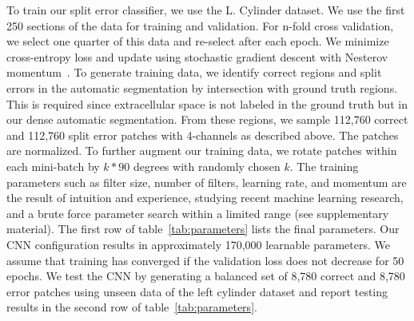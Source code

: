 To train our split error classifier, we use the L. Cylinder dataset. We use the first 250 sections of the data for training and validation. For n-fold cross validation, we select one quarter of this data and re-select after each epoch. We minimize cross-entropy loss and update using stochastic gradient descent with Nesterov momentum~\cite{nesterov}.
To generate training data, we identify correct regions and split errors in the automatic segmentation by intersection with ground truth regions. This is required since extracellular space is not labeled in the ground truth but in our dense automatic segmentation.
From these regions, we sample 112,760 correct and 112,760 split error patches with 4-channels as described above. The patches are normalized. To further augment our training data, we rotate patches within each mini-batch by $k*90$ degrees with randomly chosen $k$. The training parameters such as filter size, number of filters, learning rate, and momentum are the result of intuition and experience, studying recent machine learning research, and a brute force parameter search within a limited range (see supplementary material).
The first row of table~\ref{tab:parameters} lists the final parameters. Our CNN configuration results in approximately 170,000 learnable parameters. We assume that training has converged if the validation loss does not decrease for 50 epochs. We test the CNN by generating a balanced set of 8,780 correct and 8,780 error patches using unseen data of the left cylinder dataset and report testing results in the second row of table~\ref{tab:parameters}.

